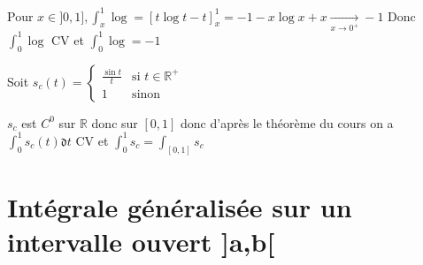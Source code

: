 \documentclass[11pt,hidelinks]{book}
\theoremstyle{mytheoremstyle}
\theoremstyle{mytheoremstyle}
\theoremstyle{mytheoremstyle}
\theoremstyle{mytheoremstyle}
\theoremstyle{mytheoremstyle}
\theoremstyle{mytheoremstyle}
\theoremstyle{mytheoremstyle}
\theoremstyle{mytheoremstyle}
\theoremstyle{myproblemstyle}
\def\mbb#1{\mathbb{#1}}
\def\mfk#1{\mathfrak{#1}}
\def\bR{\mbb{R}}
\newcommand{\deq}[3]{\begin{cases}
    #1 & \text{si } #2 \\
    #3 & \text{sinon}
\end{cases}}
\begin{document}
\begin{adjustwidth}{-2em}{-1em}
\begin{ex}
            Pour $x \in ]0,1], \int_{x}^{1} \log = \left[t \log t - t\right]^1_x = -1 - x\log x + x \xrightarrow[x \to 0^+]{} -1$
            Donc $\int_{0}^{1} \log$ CV et $\int_{0}^{1} \log = -1$
        \end{ex}

        \begin{ex}
            Soit $s_c(t) = \deq{\frac{\sin t}{t}}{t \in \bR^+}{1}$
            
            
            $s_c$ est $C^0$ sur $\bR$ donc sur $[0,1]$ donc d'après le 
            théorème du cours on a $\int_{0}^{1} s_c(t) \mfk{d}t$ CV et $\int_{0}^{1} s_c = \int_{[0,1]} s_c$
        \end{ex}

    \end{adjustwidth}
     
    
    
    \section{Intégrale généralisée sur un intervalle ouvert ]a,b[}
\end{document}

